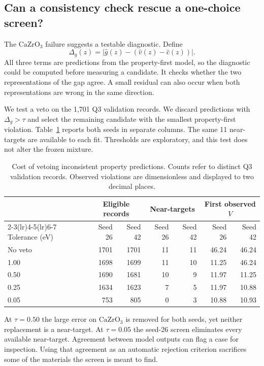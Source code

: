 \subsection{Can a consistency check rescue a one-choice screen?}
The $\mathrm{CaZrO_3}$ failure suggests a testable diagnostic. Define
\[
 \Delta_g(z)=\big|\hat g(z)-(\hat v(z)-\hat c(z))\big|.
\]
All three terms are predictions from the property-first model, so the diagnostic could be computed before measuring a candidate. It checks whether the two representations of the gap agree. A small residual can also occur when both representations are wrong in the same direction.

We test a veto on the 1,701 Q3 validation records. We discard predictions with $\Delta_g>\tau$ and select the remaining candidate with the smallest property-first violation. Table~\ref{tab:veto} reports both seeds in separate columns. The same 11 near-targets are available to each fit. Thresholds are exploratory, and this test does not alter the frozen mixture.
\begin{table}[htbp]
\caption{Cost of vetoing inconsistent property predictions. Counts refer to distinct Q3 validation records. Observed violations are dimensionless and displayed to two decimal places.}\label{tab:veto}
\centering\small\begin{tabular}{lrrrrrr}
\toprule & \multicolumn{2}{c}{Eligible records} & \multicolumn{2}{c}{Near-targets} & \multicolumn{2}{c}{First observed $V$}\\
\cmidrule(lr){2-3}\cmidrule(lr){4-5}\cmidrule(lr){6-7}
Tolerance (eV) & Seed 26 & Seed 42 & Seed 26 & Seed 42 & Seed 26 & Seed 42\\\midrule
No veto & 1701 & 1701 & 11 & 11 & 46.24 & 46.24\\
1.00 & 1698 & 1699 & 11 & 10 & 11.25 & 46.24\\
0.50 & 1690 & 1681 & 10 & 9 & 11.97 & 11.25\\
0.25 & 1634 & 1623 & 7 & 5 & 11.97 & 10.88\\
0.05 & 753 & 805 & 0 & 3 & 10.88 & 10.93\\\bottomrule
\end{tabular}
\end{table}

At $\tau=0.50$ the large error on $\mathrm{CaZrO_3}$ is removed for both seeds, yet neither replacement is a near-target. At $\tau=0.05$ the seed-26 screen eliminates every available near-target. Agreement between model outputs can flag a case for inspection. Using that agreement as an automatic rejection criterion sacrifices some of the materials the screen is meant to find.

